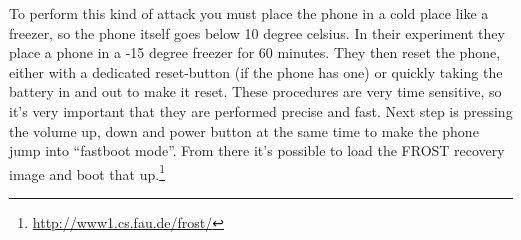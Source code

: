 To perform this kind of attack you must place the phone in a cold place like a 
freezer, so the phone itself goes below 10 degree celsius. In their experiment 
they place a phone in a -15 degree freezer for 60 minutes. They then reset the 
phone, either with a dedicated reset-button (if the phone has one) or quickly 
taking the battery in and out to make it reset. These procedures are very time 
sensitive, so it’s very important that they are performed precise and fast. 
Next step is pressing the volume up, down and power button at the same time to 
make the phone jump into “fastboot mode”. From there it’s possible to load the 
FROST recovery image and boot that up.\footnote{\url{http://www1.cs.fau.de/frost/}}
